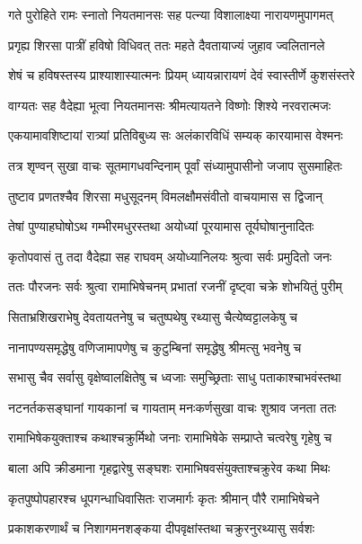 
\twolineshloka
{गते पुरोहिते रामः स्नातो नियतमानसः}
{सह पत्न्या विशालाक्ष्या नारायणमुपागमत्} %

\twolineshloka
{प्रगृह्य शिरसा पात्रीं हविषो विधिवत् ततः}
{महते दैवतायाज्यं जुहाव ज्वलितानले} %

\twolineshloka
{शेषं च हविषस्तस्य प्राश्याशास्यात्मनः प्रियम्}
{ध्यायन्नारायणं देवं स्वास्तीर्णे कुशसंस्तरे} %

\twolineshloka
{वाग्यतः सह वैदेह्या भूत्वा नियतमानसः}
{श्रीमत्यायतने विष्णोः शिश्ये नरवरात्मजः} %

\twolineshloka
{एकयामावशिष्टायां रात्र्यां प्रतिविबुध्य सः}
{अलंकारविधिं सम्यक् कारयामास वेश्मनः} %

\twolineshloka
{तत्र शृण्वन् सुखा वाचः सूतमागधवन्दिनाम्}
{पूर्वां संध्यामुपासीनो जजाप सुसमाहितः} %

\twolineshloka
{तुष्टाव प्रणतश्चैव शिरसा मधुसूदनम्}
{विमलक्षौमसंवीतो वाचयामास स द्विजान्} %

\twolineshloka
{तेषां पुण्याहघोषोऽथ गम्भीरमधुरस्तथा}
{अयोध्यां पूरयामास तूर्यघोषानुनादितः} %

\twolineshloka
{कृतोपवासं तु तदा वैदेह्या सह राघवम्}
{अयोध्यानिलयः श्रुत्वा सर्वः प्रमुदितो जनः} %

\twolineshloka
{ततः पौरजनः सर्वः श्रुत्वा रामाभिषेचनम्}
{प्रभातां रजनीं दृष्ट्वा चक्रे शोभयितुं पुरीम्} %

\twolineshloka
{सिताभ्रशिखराभेषु देवतायतनेषु च}
{चतुष्पथेषु रथ्यासु चैत्येष्वट्टालकेषु च} %

\twolineshloka
{नानापण्यसमृद्धेषु वणिजामापणेषु च}
{कुटुम्बिनां समृद्धेषु श्रीमत्सु भवनेषु च} %

\twolineshloka
{सभासु चैव सर्वासु वृक्षेष्वालक्षितेषु च}
{ध्वजाः समुच्छ्रिताः साधु पताकाश्चाभवंस्तथा} %

\twolineshloka
{नटनर्तकसङ्घानां गायकानां च गायताम्}
{मनःकर्णसुखा वाचः शुश्राव जनता ततः} %

\twolineshloka
{रामाभिषेकयुक्ताश्च कथाश्चक्रुर्मिथो जनाः}
{रामाभिषेके सम्प्राप्ते चत्वरेषु गृहेषु च} %

\twolineshloka
{बाला अपि क्रीडमाना गृहद्वारेषु सङ्घशः}
{रामाभिषवसंयुक्ताश्चक्रुरेव कथा मिथः} %

\twolineshloka
{कृतपुष्पोपहारश्च धूपगन्धाधिवासितः}
{राजमार्गः कृतः श्रीमान् पौरै रामाभिषेचने} %

\twolineshloka
{प्रकाशकरणार्थं च निशागमनशङ्कया}
{दीपवृक्षांस्तथा चक्रुरनुरथ्यासु सर्वशः} %

